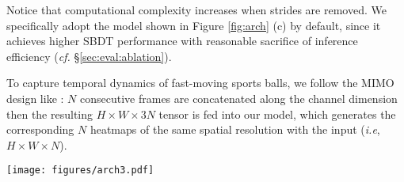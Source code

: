 \documentclass{bmvc2k}
\def\ie{\emph{i.e}\bmvaOneDot}
\begin{document}
Notice that computational complexity increases when strides are removed.
We specifically adopt the model shown in Figure \ref{fig:arch} (c) by default, since it achieves higher SBDT performance with reasonable sacrifice of inference efficiency ({\it cf.} \S \ref{sec:eval:ablation}).
\par
To capture temporal dynamics of fast-moving sports balls, we follow the MIMO design like \cite{sun+2020icpai,liu+2022cvprw}:
$N$ consecutive frames are concatenated along the channel dimension then the resulting $H \times W \times 3N$ tensor is fed into our model, which generates the corresponding $N$ heatmaps of the same spatial resolution with the input (\ie, $H \times W \times N$).
\begin{figure*}[t]
\centering
\texttt{[image: figures/arch3.pdf]}
\caption{(a) In the original stem design of HRNet \cite{wang+2021tpami,yu+2021cvpr}, spatial resolution of an input is reduced to one-fourth to be fed into HRMs. Alternatively, we propose to remove strides from the stem so that the resolution of intermediate features to be higher, as shown in (b) and (c). $N$ is the number of frames. We use (c) by default based on the ablation result in \S \ref{sec:eval:ablation}.}
\label{fig:arch}
\vspace*{-5mm}
\end{figure*}
\end{document}
